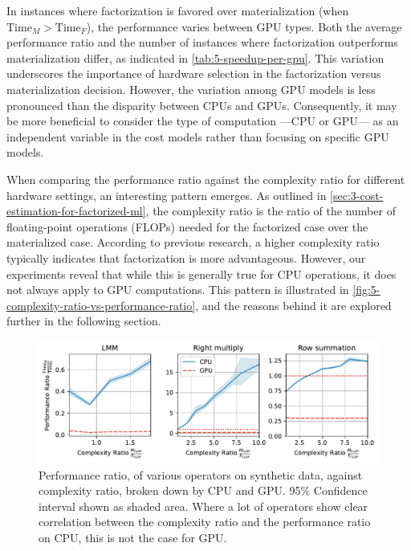 In instances where factorization is favored over materialization (when $\text{Time}_M > \text{Time}_F$), the performance varies between GPU types. Both the average performance ratio and the number of instances where factorization outperforms materialization differ, as indicated in \autoref{tab:5-speedup-per-gpu}. This variation underscores the importance of hardware selection in the factorization versus materialization decision. However, the variation among GPU models is less pronounced than the disparity between CPUs and GPUs. Consequently, it may be more beneficial to consider the type of computation —CPU or GPU— as an independent variable in the cost models rather than focusing on specific GPU models.

When comparing the performance ratio against the complexity ratio for different hardware settings, an interesting pattern emerges. As outlined in \autoref{sec:3-cost-estimation-for-factorized-ml}, the complexity ratio is the ratio of the number of floating-point operations (FLOPs) needed for the factorized case over the materialized case. According to previous research, a higher complexity ratio typically indicates that factorization is more advantageous. However, our experiments reveal that while this is generally true for CPU operations, it does not always apply to GPU computations. This pattern is illustrated in \autoref{fig:5-complexity-ratio-vs-performance-ratio}, and the reasons behind it are explored further in the following section.

\begin{figure}[ht]
  \centering
  \includegraphics[width=\linewidth]{chapters/05_cost_estimation/figures/motivation_speedup_complexity_ratio.pdf}
  \caption[Performance ratio plotted against complexity ratio]{Performance ratio, of various operators on synthetic data, against complexity ratio, broken down by CPU and GPU. 95\% Confidence interval shown as shaded area. Where a lot of operators show clear correlation between the complexity ratio and the performance ratio on CPU, this is not the case for GPU.}
  \label{fig:5-complexity-ratio-vs-performance-ratio}
\end{figure}



